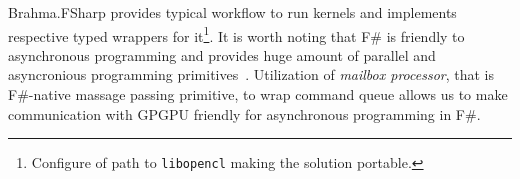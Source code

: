 Brahma.FSharp provides typical workflow to run kernels and implements respective typed wrappers for it\footnote{Configure of path to \texttt{libopencl} making the solution portable.}.
It is worth noting that F\# is friendly to asynchronous programming and provides huge amount of parallel and asyncronious programming primitives~\cite{FSharpAsync}.
Utilization of \emph{mailbox processor}, that is F\#-native massage passing primitive, to wrap command queue allows us to make communication with GPGPU friendly for asynchronous programming in F\#.